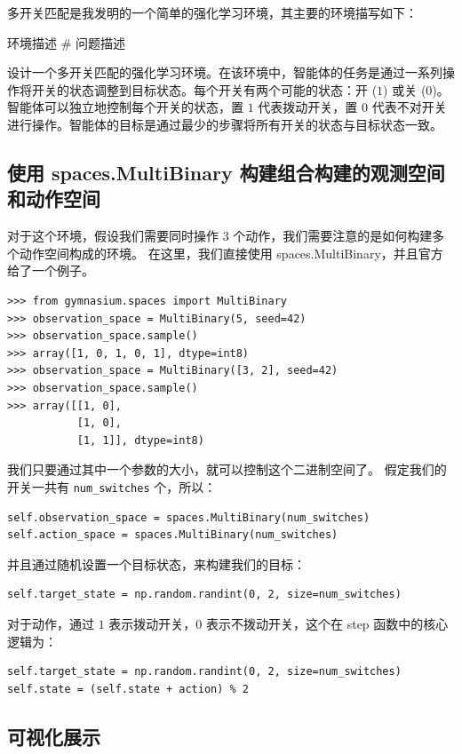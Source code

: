 多开关匹配是我发明的一个简单的强化学习环境，其主要的环境描写如下：

\begin{definition*}{环境描述}
\# 问题描述

    设计一个多开关匹配的强化学习环境。在该环境中，智能体的任务是通过一系列操作将开关的状态调整到目标状态。每个开关有两个可能的状态：开 (\(1\)) 或关 (\(0\))。智能体可以独立地控制每个开关的状态，置 \(1\) 代表拨动开关，置 \(0\) 代表不对开关进行操作。智能体的目标是通过最少的步骤将所有开关的状态与目标状态一致。
\end{definition*}

\subsection{使用 \textsf{spaces.MultiBinary} 构建组合构建的观测空间和动作空间}

对于这个环境，假设我们需要同时操作 \(3\) 个动作，我们需要注意的是如何构建多个动作空间构成的环境。
在这里，我们直接使用 \textsf{spaces.MultiBinary}，并且官方给了一个例子。
\begin{verbatim}
>>> from gymnasium.spaces import MultiBinary
>>> observation_space = MultiBinary(5, seed=42)
>>> observation_space.sample()
>>> array([1, 0, 1, 0, 1], dtype=int8)
>>> observation_space = MultiBinary([3, 2], seed=42)
>>> observation_space.sample()
>>> array([[1, 0],
           [1, 0],
           [1, 1]], dtype=int8)
\end{verbatim}
我们只要通过其中一个参数的大小，就可以控制这个二进制空间了。
假定我们的开关一共有 \texttt{num\_switches} 个，所以：
\begin{verbatim}
self.observation_space = spaces.MultiBinary(num_switches)
self.action_space = spaces.MultiBinary(num_switches)
\end{verbatim}
并且通过随机设置一个目标状态，来构建我们的目标：
\begin{verbatim}
self.target_state = np.random.randint(0, 2, size=num_switches)
\end{verbatim}
对于动作，通过 \(1\) 表示拨动开关，\(0\) 表示不拨动开关，这个在 \textsf{step} 函数中的核心逻辑为：
\begin{verbatim}
self.target_state = np.random.randint(0, 2, size=num_switches)
self.state = (self.state + action) % 2
\end{verbatim}

\subsection{可视化展示}

